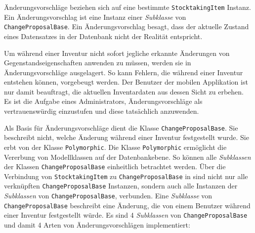 Änderungsvorschläge beziehen sich auf eine bestimmte
\texttt{StocktakingItem} Instanz. Ein Änderungsvorschlag ist eine
Instanz einer
\emph{Subklasse}
von \texttt{ChangeProposalBase}. Ein Änderungsvorschlag besagt, dass der
aktuelle Zustand eines Datensatzes in der Datenbank nicht der Realität
entspricht.

Um während einer Inventur nicht sofort jegliche erkannte Änderungen von
Gegenstandseigenschaften anwenden zu müssen, werden sie in
Änderungsvorschläge ausgelagert. So kann Fehlern, die während einer
Inventur entstehen können, vorgebeugt werden. Der Benutzer der mobilen
Applikation ist nur damit beauftragt, die aktuellen Inventardaten aus
dessen Sicht zu erbehen. Es ist die Aufgabe eines Administrators,
Änderungsvorschläge als vertrauenswürdig einzustufen und diese
tatsächlich anzuwenden.

Als Basis für Änderungsvorschläge dient die Klasse
\texttt{ChangeProposalBase}. Sie beschreibt nicht, welche Änderung
während einer Inventur festgestellt wurde. Sie erbt von der Klasse
\texttt{Polymorphic}. Die Klasse \texttt{Polymorphic} ermöglicht die
Vererbung von Modellklassen auf der Datenbankebene. So können alle
\emph{Subklassen}
der Klassen \texttt{ChangeProposalBase} einheitlich betrachtet werden.
Über die Verbindung von \texttt{StocktakingItem} zu
\texttt{ChangeProposalBase} in 
sind nicht nur alle verknüpften \texttt{ChangeProposalBase} Instanzen,
sondern auch alle Instanzen der
\emph{Subklassen}
von \texttt{ChangeProposalBase}, verbunden. Eine
\emph{Subklasse}
von \texttt{ChangeProposalBase} beschreibt eine Änderung, die von einem
Benutzer während einer Inventur festgestellt würde. Es sind 4
\emph{Subklassen}
von \texttt{ChangeProposalBase} und damit 4 Arten von
Änderungsvorschlägen implementiert:


